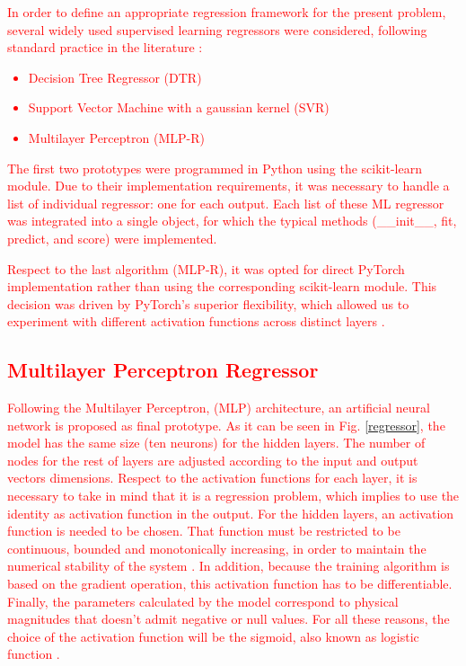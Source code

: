 \documentclass[review]{elsarticle}
\begin{document}
\textcolor{blue}{\textcolor{red}{In order to define an appropriate regression framework for the present problem, several widely used supervised learning regressors were considered, following standard practice in the literature \cite{witten2011data}:
\begin{itemize}
    \item Decision Tree Regressor (DTR)
    \item Support Vector Machine with a gaussian kernel (SVR)
    \item Multilayer Perceptron (MLP-R)
\end{itemize}

The first two prototypes were programmed in Python using the scikit-learn module. Due to their implementation requirements, it was necessary to handle a list of individual regressor: one for each output. Each list of these ML regressor was integrated into a single object, for which the typical methods (\_\_init\_\_, fit, predict, and score) were implemented.

Respect to the last algorithm (MLP-R), it was opted for direct PyTorch implementation rather than using the corresponding scikit-learn module. This decision was driven by PyTorch's superior flexibility, which allowed us to experiment with different activation functions across distinct layers \cite{raschka2020machine}.  

\subsection{Multilayer Perceptron Regressor}

Following the Multilayer Perceptron, (MLP) architecture, an artificial neural network is proposed as final prototype. As it can be seen in Fig. \ref{regressor}, the model has the same size (ten neurons) for the hidden layers. The number of nodes for the rest of layers are adjusted according to the input and output vectors dimensions. Respect to the activation functions for each layer, it is necessary to take in mind that it is a regression problem, which implies to use the identity as activation function in the output. For the hidden layers, an activation function is needed to be chosen. That function must be restricted to be continuous, bounded and monotonically  increasing, in order to maintain the numerical stability of the system \cite{haykin1999neural}. In addition, because the training algorithm is based on the gradient operation, this activation function has to be differentiable. Finally, the parameters calculated by the model correspond to physical magnitudes that doesn't admit negative or null values. For all these reasons, the choice of the activation function will be the sigmoid, also known as logistic function \cite{bishop1995mlp}.

}}
\end{document}
